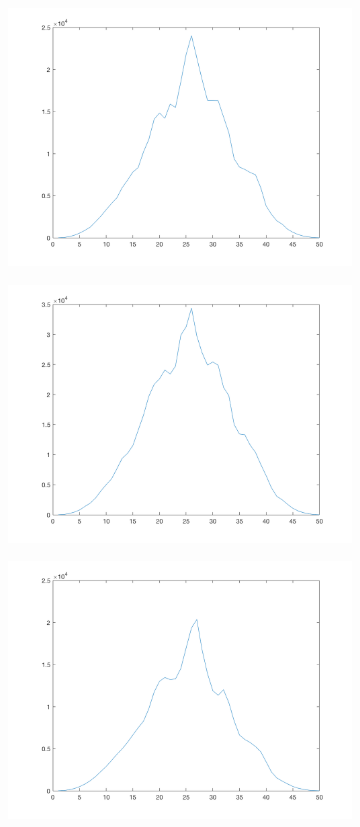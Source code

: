\begin{figure}[htpb]
\begin{subfigure}{.25\textwidth}
\includegraphics[width=1\textwidth]{img/ProjXI1sigma150}
\end{subfigure}%
\begin{subfigure}{.25\textwidth}
\includegraphics[width=1\textwidth]{img/ProjXI1sigma300}
\end{subfigure}
\quad
\begin{subfigure}{.25\textwidth}
\includegraphics[width=1\textwidth]{img/ProjXI2sigma0}

\end{subfigure}
\end{figure}

